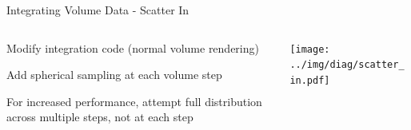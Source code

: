 \documentclass[10pt,compress,professionalfont]{beamer}
\begin{document}
\begin{frame}{Integrating Volume Data - Scatter In}

    \begin{columns}
        \begin{column}{0.5\textwidth}

            Modify integration code (normal volume rendering)\\
            \vspace{8mm}

            Add spherical sampling at each volume step\\
            \vspace{8mm}

            For increased performance, attempt full distribution across multiple steps, not at each step

        \end{column}
        \begin{column}{0.5\textwidth}
            \texttt{[image: ../img/diag/scatter\_in.pdf]}\\
        \end{column}
    \end{columns}

\end{frame}
\end{document}
